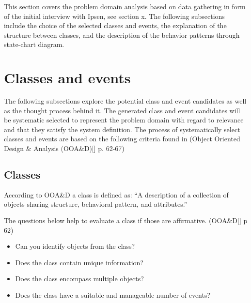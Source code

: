 This section covers the problem domain analysis based on data gathering in form of the initial interview with Ipsen, see section x. The following subsections include the choice of the selected classes and events, the explanation of the structure between classes, and the description of the behavior patterns through state-chart diagram.

\section{Classes and events}
The following subsections explore the potential class and event candidates as well as the thought process behind it. The generated class and event candidates will be systematic selected to represent the problem domain with regard to relevance and that they satisfy the system definition. The process of systematically select classes and events are based on the following criteria found in (Object Oriented Design \& Analysis (OOA\&D)[] p. 62-67)

\subsection{Classes}
According to OOA\&D a class is defined as:
“A description of a collection of objects sharing structure, behavioral pattern, and attributes.”

The questions below help to evaluate a class if those are affirmative. (OOA\&D[] p 62)
\begin{itemize}
	\item Can you identify objects from the class?
	\item Does the class contain unique information?
	\item Does the class encompass multiple objects?
	\item Does the class have a suitable and manageable number of events?
\end{itemize}

